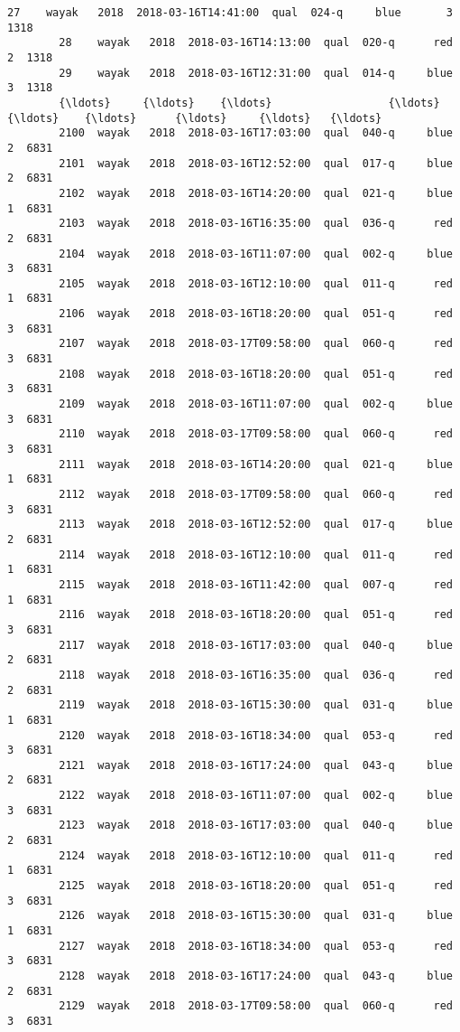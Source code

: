 \documentclass[11pt]{article}
\begin{document}
\begin{Verbatim}[commandchars=\\\{\}]
        27    wayak   2018  2018-03-16T14:41:00  qual  024-q     blue       3  1318   
        28    wayak   2018  2018-03-16T14:13:00  qual  020-q      red       2  1318   
        29    wayak   2018  2018-03-16T12:31:00  qual  014-q     blue       3  1318   
        {\ldots}     {\ldots}    {\ldots}                  {\ldots}   {\ldots}    {\ldots}      {\ldots}     {\ldots}   {\ldots}   
        2100  wayak   2018  2018-03-16T17:03:00  qual  040-q     blue       2  6831   
        2101  wayak   2018  2018-03-16T12:52:00  qual  017-q     blue       2  6831   
        2102  wayak   2018  2018-03-16T14:20:00  qual  021-q     blue       1  6831   
        2103  wayak   2018  2018-03-16T16:35:00  qual  036-q      red       2  6831   
        2104  wayak   2018  2018-03-16T11:07:00  qual  002-q     blue       3  6831   
        2105  wayak   2018  2018-03-16T12:10:00  qual  011-q      red       1  6831   
        2106  wayak   2018  2018-03-16T18:20:00  qual  051-q      red       3  6831   
        2107  wayak   2018  2018-03-17T09:58:00  qual  060-q      red       3  6831   
        2108  wayak   2018  2018-03-16T18:20:00  qual  051-q      red       3  6831   
        2109  wayak   2018  2018-03-16T11:07:00  qual  002-q     blue       3  6831   
        2110  wayak   2018  2018-03-17T09:58:00  qual  060-q      red       3  6831   
        2111  wayak   2018  2018-03-16T14:20:00  qual  021-q     blue       1  6831   
        2112  wayak   2018  2018-03-17T09:58:00  qual  060-q      red       3  6831   
        2113  wayak   2018  2018-03-16T12:52:00  qual  017-q     blue       2  6831   
        2114  wayak   2018  2018-03-16T12:10:00  qual  011-q      red       1  6831   
        2115  wayak   2018  2018-03-16T11:42:00  qual  007-q      red       1  6831   
        2116  wayak   2018  2018-03-16T18:20:00  qual  051-q      red       3  6831   
        2117  wayak   2018  2018-03-16T17:03:00  qual  040-q     blue       2  6831   
        2118  wayak   2018  2018-03-16T16:35:00  qual  036-q      red       2  6831   
        2119  wayak   2018  2018-03-16T15:30:00  qual  031-q     blue       1  6831   
        2120  wayak   2018  2018-03-16T18:34:00  qual  053-q      red       3  6831   
        2121  wayak   2018  2018-03-16T17:24:00  qual  043-q     blue       2  6831   
        2122  wayak   2018  2018-03-16T11:07:00  qual  002-q     blue       3  6831   
        2123  wayak   2018  2018-03-16T17:03:00  qual  040-q     blue       2  6831   
        2124  wayak   2018  2018-03-16T12:10:00  qual  011-q      red       1  6831   
        2125  wayak   2018  2018-03-16T18:20:00  qual  051-q      red       3  6831   
        2126  wayak   2018  2018-03-16T15:30:00  qual  031-q     blue       1  6831   
        2127  wayak   2018  2018-03-16T18:34:00  qual  053-q      red       3  6831   
        2128  wayak   2018  2018-03-16T17:24:00  qual  043-q     blue       2  6831   
        2129  wayak   2018  2018-03-17T09:58:00  qual  060-q      red       3  6831   
        

\end{Verbatim}
\end{document}

